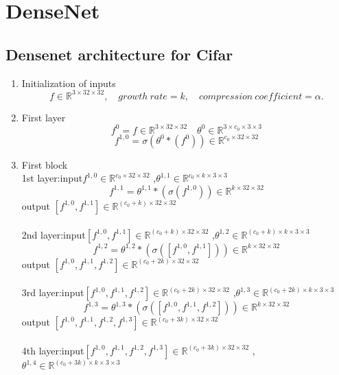 \section{DenseNet}
\subsection{Densenet architecture for Cifar}
\begin{enumerate}
\item Initialization of inputs
$$
f \in \mathbb{R}^{3\times 32\times 32}, \quad
growth~rate = k, \quad
compression~coefficient = \alpha.
$$
\item First layer
$$f^0=f\in \mathbb{R}^{3\times 32\times 32} \quad \theta^0 \in \mathbb{R}^{3\times c_0\times 3\times 3}$$
$$f^{1,0}= \sigma(\theta^{0} \ast (f^0))\in \mathbb{R}^{c_0\times 32\times 32}$$
\item First block\\
1st layer:\quad input$f^{1,0}\in \mathbb{R}^{c_0\times 32\times 32}$ ,$\theta^{1,1} \in \mathbb{R}^{c_0\times k\times 3\times 3}$
$$f^{1,1}=\theta^{1,1} \ast (\sigma(f^{1,0}))\in \mathbb{R}^{k\times 32\times 32}$$
\quad\quad\quad\quad\quad output $[f^{1,0},f^{1,1}] \in \mathbb{R}^{(c_0+k)\times 32\times 32}$
\\ \hspace*{\fill} \\
2nd layer:\quad input$[f^{1,0},f^{1,1}] \in \mathbb{R}^{(c_0+k)\times 32\times 32}$ ,$\theta^{1,2} \in \mathbb{R}^{(c_0+k)\times k\times3\times 3 }$
$$ f^{1,2}=\theta^{1,2} \ast (\sigma([f^{1,0},f^{1,1}]))\in \mathbb{R}^{k\times 32\times 32}$$
\quad\quad\quad\quad\quad output $[f^{1,0},f^{1,1}, f^{1,2}] \in \mathbb{R}^{(c_0+2k)\times 32\times 32}$
\\ \hspace*{\fill} \\
3rd layer:\quad input$[f^{1,0},f^{1,1},f^{1,2}] \in \mathbb{R}^{(c_0+2k)\times 32\times 32}$ ,$\theta^{1,3} \in \mathbb{R}^{ (c_0+2k)\times k\times 3\times 3 }$
$$ f^{1,3}=\theta^{1,3} \ast (\sigma([f^{1,0},f^{1,1},f^{1,2}]))\in \mathbb{R}^{k\times 32\times 32}$$
\quad\quad\quad\quad\quad output $[f^{1,0},f^{1,1}, f^{1,2},f^{1,3}] \in \mathbb{R}^{(c_0+3k)\times 32\times 32}$
\\ \hspace*{\fill} \\
4th layer:\quad input$[f^{1,0},f^{1,1},f^{1,2},f^{1,3}] \in \mathbb{R}^{(c_0+3k)\times 32\times 32}$ ,$\theta^{1,4} \in \mathbb{R}^{ (c_0+3k)\times k\times 3\times 3}$

\end{enumerate}
